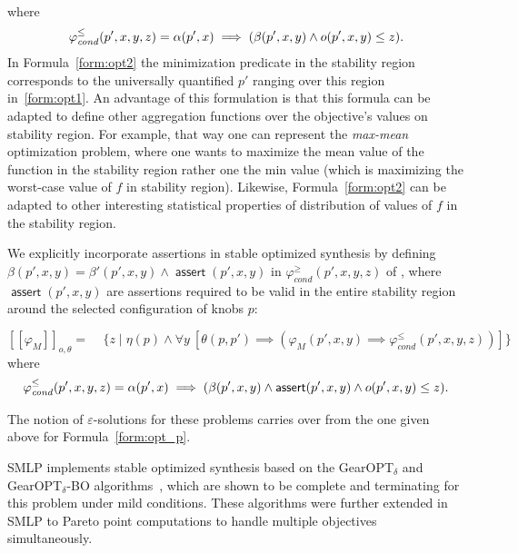 \documentclass[a4paper,parskip=half]{article} %
\newcommand*\eqdef=
\newcommand*\assert{\operatorname{\mathsf{assert}}}
\newcommand*\regmax[2]{[[{#1}]]_{#2}}
\newcommand*\objv{o}
\begin{document}
where \[
\varphi_{\mathit{cond}}^{\leq}(p',x,y,z)
\eqdef\alpha(p',x) \implies (\beta(p',x,y) \wedge \objv(p',x,y) \leq z)\text.\]
In Formula~\eqref{form:opt2} the minimization predicate in the stability region corresponds to the universally quantified $p'$ ranging over this region in~\eqref{form:opt1}.
An advantage of this formulation is that this formula can be adapted to define other aggregation functions over the objective's values on stability region.
For example, that way one can represent the \emph{max-mean} optimization problem, where one wants to maximize the mean value of the function in the stability region rather one the min value (which is maximizing the worst-case value of $f$ in stability region).
Likewise, Formula~\eqref{form:opt2} can be adapted to other interesting statistical properties of distribution of values of $f$ in the stability region.

We explicitly incorporate assertions in stable optimized synthesis by defining $\beta(p',x,y)\eqdef \beta'(p',x,y) \wedge \assert(p',x,y)$ in $\varphi_{\mathit{cond}}^{\geq}(p',x,y,z)$ of , where  $\assert(p',x,y)$ are assertions required to be valid in the entire stability region around the selected configuration of knobs $p$:

\begin{equation}\label{form:optsyn}
\regmax{\varphi_M}{\objv,\theta}
\eqdef
\mathop{\max\limits_{p}} \mathop{\min\limits_{x, p'}}
\{ z \mid \eta(p) \wedge
    \forall y~[
     \theta(p,p') \implies
     (\varphi_M(p',x,y)  \implies  \varphi_{\mathit{cond}}^{\leq}(p',x,y,z))]\}
\end{equation}
where \[
\varphi_{\mathit{cond}}^{\leq}(p',x,y,z)
\eqdef\alpha(p',x) \implies ( \beta(p',x,y) \wedge \assert(p',x,y) \wedge \objv(p',x,y) \leq z)\text.\]


The notion of $\varepsilon$-solutions for these problems carries over from the one given above for Formula~\eqref{form:opt_p}.

SMLP implements stable optimized synthesis based on the GearOPT$_\delta$ and GearOPT$_\delta$-BO 
algorithms~\cite{DBLP:conf/fmcad/BrausseKK20,DBLP:conf/ijcai/BrausseKK22}, which are shown to be complete and terminating 
for this problem under mild conditions. 
These algorithms were further extended in SMLP to Pareto point computations to handle multiple objectives simultaneously.
\end{document}
